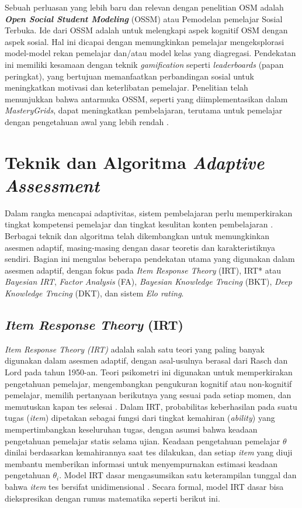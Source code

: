 Sebuah perluasan yang lebih baru dan relevan dengan penelitian OSM adalah
\textbf{\textit{Open Social Student Modeling}} (OSSM) atau
Pemodelan pemelajar Sosial Terbuka. Ide dari OSSM adalah untuk
melengkapi aspek kognitif OSM dengan aspek sosial.
Hal ini dicapai dengan memungkinkan pemelajar mengeksplorasi model-model
rekan pemelajar dan/atau model kelas yang diagregasi. Pendekatan ini memiliki kesamaan dengan teknik \textit{gamification} seperti \textit{leaderboards} (papan peringkat), yang bertujuan memanfaatkan perbandingan sosial untuk meningkatkan motivasi dan keterlibatan pemelajar. Penelitian telah menunjukkan bahwa antarmuka OSSM, seperti yang diimplementasikan dalam \textit{MasteryGrids},
dapat meningkatkan pembelajaran, terutama untuk pemelajar dengan pengetahuan awal
yang lebih rendah \autocite{Brusilovsky2016}.

\section{Teknik dan Algoritma \textit{Adaptive Assessment}}
\label{sec:teknik_algoritma_aa}
Dalam rangka mencapai adaptivitas, sistem pembelajaran perlu memperkirakan tingkat 
kompetensi pemelajar dan tingkat kesulitan konten pembelajaran \autocite{Vesin2022}.
Berbagai teknik dan algoritma telah dikembangkan untuk memungkinkan asesmen adaptif, 
masing-masing dengan dasar teoretis dan karakteristiknya sendiri. Bagian ini mengulas
beberapa pendekatan utama yang digunakan dalam asesmen adaptif, dengan fokus pada 
\textit{Item Response Theory} (IRT), IRT* atau \textit{Bayesian IRT},
\textit{Factor Analysis} (FA), \textit{Bayesian Knowledge Tracing} (BKT),
\textit{Deep Knowledge Tracing} (DKT), dan sistem \textit{Elo rating}.

\subsection{\textit{Item Response Theory} (IRT)}
\textit{Item Response Theory (IRT)} adalah salah satu teori yang paling banyak
digunakan dalam asesmen adaptif, dengan asal-usulnya berasal dari Rasch dan Lord 
pada tahun 1950-an. Teori psikometri ini digunakan untuk memperkirakan pengetahuan 
pemelajar, mengembangkan pengukuran kognitif atau non-kognitif pemelajar, memilih 
pertanyaan berikutnya yang sesuai pada setiap momen, dan memutuskan kapan tes selesai 
\autocite{Ihichr2024}. Dalam IRT, probabilitas keberhasilan pada suatu tugas 
(\textit{item}) dipetakan sebagai fungsi dari tingkat kemahiran (\textit{ability}) 
yang mempertimbangkan keseluruhan tugas, dengan asumsi bahwa keadaan pengetahuan 
pemelajar statis selama ujian. Keadaan pengetahuan pemelajar $\theta$ dinilai berdasarkan
kemahirannya saat tes dilakukan, dan setiap \textit{item} yang diuji membantu
memberikan informasi untuk menyempurnakan estimasi keadaan pengetahuan $\theta_{i}$. 
Model IRT dasar mengasumsikan satu keterampilan tunggal dan bahwa \textit{item} 
tes bersifat unidimensional \autocite{Minn2022}. Secara formal, model IRT dasar
bisa diekspresikan dengan rumus matematika seperti berikut ini.

